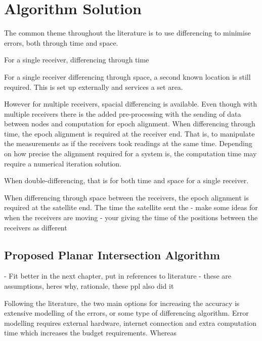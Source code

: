 
\def\chapdir{./ChapterPerception}

\chapter{Algorithm Solution}\label{ch:perception}

The common theme throughout the literature is to use differencing to minimise errors, both through time and space.

For a single receiver, differencing through time 

For a single receiver differencing through space, a second known location is still required. This is set up externally and services a set area.

However for multiple receivers, spacial differencing is available. Even though with multiple receivers there is the added pre-processing with the sending of data between nodes and computation for epoch alignment. When differencing through time, the epoch alignment is required at the receiver end. That is, to manipulate the measurements as if the receivers took readings at the same time. Depending on how precise the alignment required for a system is, the computation time may require a numerical iteration solution.

When double-differencing, that is for both time and space for a single receiver.

When differencing through space between the receivers, the epoch alignment is required at the satellite end. The time the satellite sent the 
- make some ideas for when the receivers are moving - your giving the time of the positions between the receivers as different 



\section{Proposed Planar Intersection Algorithm}
- Fit better in the next chapter, put in references to literature
- these are assumptions, heres why, rationale, these ppl also did it

Following the literature, the two main options for increasing the accuracy is extensive modelling of the errors, or some type of differencing algorithm. Error modelling requires external hardware, internet connection and extra computation time which increases the budget requirements. Whereas 



